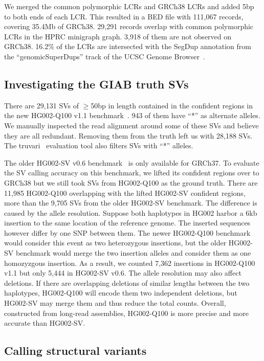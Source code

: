 \documentclass[a4paper,num-refs]{oup-contemporary}
\begin{document}
We merged the common polymorphic LCRs and GRCh38 LCRs and added 5bp to both ends of each LCR.
This resulted in a BED file with 111,067 records, covering 35.4Mb of GRCh38.
29,291 records overlap with common polymorphic LCRs in the HPRC minigraph graph.
3,918 of them are not observed on GRCh38.
16.2\% of the LCRs are intersected with the SegDup annotation from the ``genomicSuperDups'' track of the UCSC Genome Browser~\cite{Perez:2025aa}.

\subsection{Investigating the GIAB truth SVs}

There are 29,131 SVs of $\ge$50bp in length contained in the confident regions in the new HG002-Q100 v1.1 benchmark~\cite{Hansen2025.09.21.677443}.
943 of them have ``*'' as alternate alleles.
We manually inspected the read alignment around some of these SVs and believe they are all redundant.
Removing them from the truth left us with 28,188 SVs.
The truvari~\cite{English:2022aa} evaluation tool also filters SVs with ``*'' alleles.

The older HG002-SV v0.6 benchmark~\cite{Zook:2020aa} is only available for GRCh37.
To evaluate the SV calling accuracy on this benchmark,
we lifted its confident regions over to GRCh38
but we still took SVs from HG002-Q100 as the ground truth.
There are 11,985 HG002-Q100 overlapping with the lifted HG002-SV confident regions,
more than the 9,705 SVs from the older HG002-SV benchmark.
The difference is caused by the allele resolution.
Suppose both haplotypes in HG002 harbor a 6kb insertion to the same location of the reference genome.
The inserted sequences however differ by one SNP between them.
The newer HG002-Q100 benchmark
would consider this event as two heterozygous insertions,
but the older HG002-SV benchmark would merge the two insertion alleles and consider them as one homozyzgous insertion.
As a result, we counted 7,362 insertions in HG002-Q100 v1.1 but only 5,444 in HG002-SV v0.6.
The allele resolution may also affect deletions.
If there are overlapping deletions of similar lengths between the two haplotypes,
HG002-Q100 will encode them two independent deletions,
but HG002-SV may merge them and thus reduce the total counts.
Overall, constructed from long-read assemblies, HG002-Q100 is more precise and more accurate than HG002-SV.

\subsection{Calling structural variants}
\end{document}
